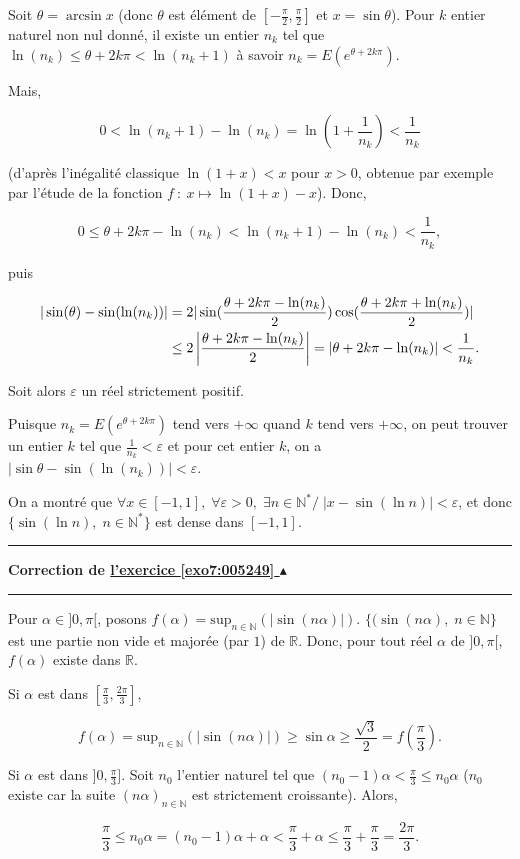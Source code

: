 \documentclass[11pt,a4paper]{article}
\newcommand{\Nn}{\mathbb{N}} \newcommand{\N}{\mathbb{N}}
\newcommand{\Rr}{\mathbb{R}} \newcommand{\R}{\mathbb{R}}
\newcommand{\Arcsin}{\mathop{\mathrm{arcsin}}\nolimits}
\newcounter{exo}
\newcommand{\correction}[1]{\hypertarget{cor7:#1}{}\label{cor7:#1}{\bf Correction de \hyperlink{exo7:#1}{l'exercice \ref{exo7:#1} $\blacktriangle$}}\vspace{1mm}\hrule\vspace{1mm}}
\newcommand{\fincorrection}{\vspace{1mm}\hrule\vspace*{7mm}}
\begin{document}
Soit $\theta=\Arcsin x$ (donc $\theta$ est élément de $[-\frac{\pi}{2},\frac{\pi}{2}]$ et $x=\sin\theta$). Pour $k$ entier naturel non nul donné, il existe un entier $n_k$ tel que $\ln(n_k)\leq \theta+2k\pi<\ln(n_k+1)$ à savoir $n_k=E(e^{\theta+2k\pi})$.

Mais,

$$0<\ln(n_k+1)-\ln(n_k)=\ln(1+\frac{1}{n_k})<\frac{1}{n_k}$$

(d'après l'inégalité classique $\ln(1+x)<x$ pour $x>0$, obtenue par exemple par l'étude de la fonction $f~:~x\mapsto\ln(1+x)-x$).
Donc,

$$0\leq\theta+2k\pi-\ln(n_k)<\ln(n_k+1)-\ln(n_k)<\frac{1}{n_k},$$

puis 

\begin{align*}\ensuremath
|\sin(\theta)-\sin(\ln(n_k))|&=2|\sin(\frac{\theta+2k\pi-\ln(n_k)}{2})\cos(\frac{\theta+2k\pi+\ln(n_k)}{2})|\\
 &\leq2\left|\frac{\theta+2k\pi-\ln(n_k)}{2}\right|=|\theta+2k\pi-\ln(n_k)|<\frac{1}{n_k}.
\end{align*}

Soit alors $\varepsilon$ un réel strictement positif.

Puisque $n_k=E(e^{\theta+2k\pi})$ tend vers $+\infty$ quand $k$ tend vers $+\infty$, on peut trouver un entier $k$ tel que  $\frac{1}{n_k}<\varepsilon$ et pour cet entier $k$, on a $|\sin\theta-\sin(\ln(n_k))|<\varepsilon$.

On a montré que $\forall x\in[-1,1],\;\forall\varepsilon>0,\;\exists n\in\Nn^*/\;|x-\sin(\ln n)|<\varepsilon$, et donc $\{\sin(\ln n),\;n\in\Nn^*\}$ est dense dans $[-1,1]$.
\fincorrection
\correction{005249}
Pour $\alpha\in]0,\pi[$, posons $f(\alpha)=\mbox{sup}_{n\in\Nn}(|\sin(n\alpha)|)$. $\{(\sin(n\alpha),\;n\in\Nn\}$ est une partie non vide et majorée (par $1$) de $\Rr$. Donc, pour tout réel $\alpha$ de $]0,\pi[$, $f(\alpha)$ existe dans $\Rr$.

Si $\alpha$ est dans $[\frac{\pi}{3},\frac{2\pi}{3}]$,

$$f(\alpha)=\mbox{sup}_{n\in\Nn}(|\sin(n\alpha)|)\geq\sin\alpha\geq\frac{\sqrt{3}}{2}=f(\frac{\pi}{3}).$$

Si $\alpha$ est dans $]0,\frac{\pi}{3}]$. Soit $n_0$ l'entier naturel tel que $(n_0-1)\alpha<\frac{\pi}{3}\leq n_0\alpha$ ($n_0$ existe car la suite $(n\alpha)_{n\in\Nn}$ est strictement croissante). Alors, 
 
$$\frac{\pi}{3}\leq n_0\alpha=(n_0-1)\alpha+\alpha<\frac{\pi}{3}+\alpha\leq\frac{\pi}{3}+\frac{\pi}{3}=\frac{2\pi}{3}.$$
\end{document}
